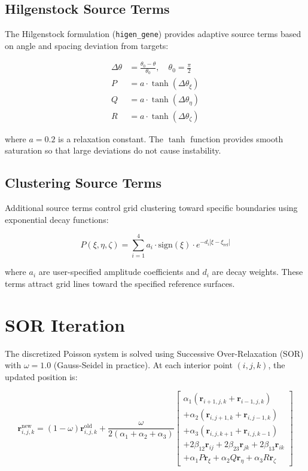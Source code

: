 \documentclass[11pt,a4paper]{report}
\newcommand{\rvec}{\bm{r}}
\begin{document}
\subsection{Hilgenstock Source Terms}

The Hilgenstock formulation (\texttt{higen\_gene}) provides adaptive source terms based on angle and spacing deviation from targets:

\begin{align}
    \Delta\theta &= \frac{\theta_0 - \theta}{\theta_0}, \quad \theta_0 = \frac{\pi}{2} \\
    P &= a \cdot \tanh(\Delta\theta_\xi) \\
    Q &= a \cdot \tanh(\Delta\theta_\eta) \\
    R &= a \cdot \tanh(\Delta\theta_\zeta)
\end{align}

where $a = 0.2$ is a relaxation constant. The $\tanh$ function provides smooth saturation so that large deviations do not cause instability.

\subsection{Clustering Source Terms}

Additional source terms control grid clustering toward specific boundaries using exponential decay functions:

\begin{equation}
    P(\xi, \eta, \zeta) = \sum_{i=1}^{4} a_i \cdot \text{sign}(\xi) \cdot e^{-d_i |\xi - \xi_{\text{ref}}|}
\end{equation}

where $a_i$ are user-specified amplitude coefficients and $d_i$ are decay weights. These terms attract grid lines toward the specified reference surfaces.

\section{SOR Iteration}

The discretized Poisson system is solved using Successive Over-Relaxation (SOR) with $\omega = 1.0$ (Gauss-Seidel in practice). At each interior point $(i,j,k)$, the updated position is:

\begin{equation}
    \rvec_{i,j,k}^{\text{new}} = (1 - \omega)\rvec_{i,j,k}^{\text{old}} + \frac{\omega}{2(\alpha_1 + \alpha_2 + \alpha_3)}
    \begin{bmatrix}
        \alpha_1(\rvec_{i+1,j,k} + \rvec_{i-1,j,k}) \\
        + \alpha_2(\rvec_{i,j+1,k} + \rvec_{i,j-1,k}) \\
        + \alpha_3(\rvec_{i,j,k+1} + \rvec_{i,j,k-1}) \\
        + 2\beta_{12}\rvec_{ij} + 2\beta_{23}\rvec_{jk} + 2\beta_{13}\rvec_{ik} \\
        + \alpha_1 P \rvec_\xi + \alpha_2 Q \rvec_\eta + \alpha_3 R \rvec_\zeta
    \end{bmatrix}
\end{equation}
\end{document}
